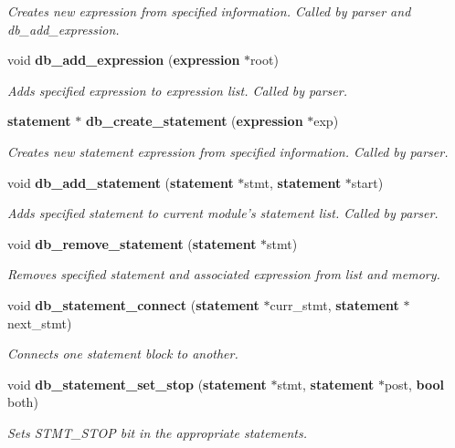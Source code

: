 \begin{CompactItemize}
\begin{CompactList}\small\item\em Creates new expression from specified information. Called by parser and db\_\-add\_\-expression.\item\end{CompactList}\item 
void {\bf db\_\-add\_\-expression} ({\bf expression} $\ast$root)
\begin{CompactList}\small\item\em Adds specified expression to expression list. Called by parser.\item\end{CompactList}\item 
{\bf statement} $\ast$ {\bf db\_\-create\_\-statement} ({\bf expression} $\ast$exp)
\begin{CompactList}\small\item\em Creates new statement expression from specified information. Called by parser.\item\end{CompactList}\item 
void {\bf db\_\-add\_\-statement} ({\bf statement} $\ast$stmt, {\bf statement} $\ast$start)
\begin{CompactList}\small\item\em Adds specified statement to current module's statement list. Called by parser.\item\end{CompactList}\item 
void {\bf db\_\-remove\_\-statement} ({\bf statement} $\ast$stmt)
\begin{CompactList}\small\item\em Removes specified statement and associated expression from list and memory.\item\end{CompactList}\item 
void {\bf db\_\-statement\_\-connect} ({\bf statement} $\ast$curr\_\-stmt, {\bf statement} $\ast$next\_\-stmt)
\begin{CompactList}\small\item\em Connects one statement block to another.\item\end{CompactList}\item 
void {\bf db\_\-statement\_\-set\_\-stop} ({\bf statement} $\ast$stmt, {\bf statement} $\ast$post, {\bf bool} both)
\begin{CompactList}\small\item\em Sets STMT\_\-STOP bit in the appropriate statements.\item\end{CompactList}\item 

\end{CompactItemize}
